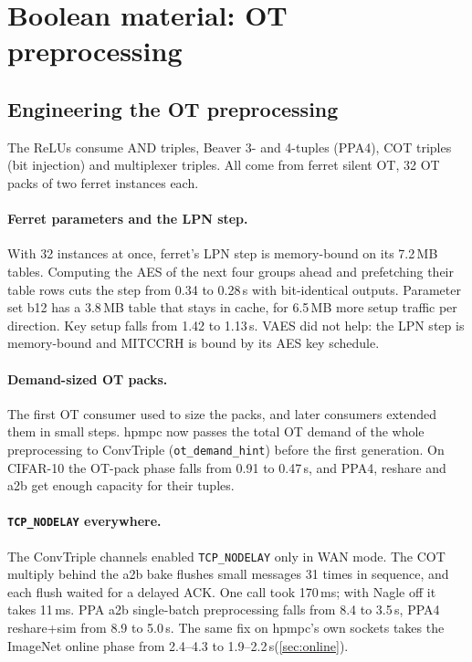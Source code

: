 \documentclass[10pt,a4paper]{article}
\newcommand{\flag}[1]{\nolinkurl{#1}}
\newcommand{\ms}{\,ms\xspace}
\newcommand{\s}{\,s\xspace}
\begin{document}
\section{Boolean material: OT preprocessing}\label{sec:ot}




\subsection{Engineering the OT preprocessing}

The ReLUs consume AND triples, Beaver 3- and 4-tuples (PPA4), COT triples (bit injection) and multiplexer
triples. All come from ferret silent OT, 32 OT packs of two ferret instances each.

\paragraph{Ferret parameters and the LPN step.} With 32 instances at once, ferret's LPN step is
memory-bound on its 7.2\,MB tables. Computing the AES of the next four groups ahead and prefetching their table rows
cuts the step from 0.34 to 0.28\s with bit-identical outputs. Parameter set b12 has a 3.8\,MB table that
stays in cache, for 6.5\,MB more setup traffic per direction. Key setup falls from 1.42 to 1.13\s. VAES did not help:
the LPN step is memory-bound and MITCCRH is bound by its AES key schedule.

\paragraph{Demand-sized OT packs.} The first OT consumer used to size the packs, and later consumers
extended them in small steps. hpmpc now passes the total OT demand of the whole preprocessing to ConvTriple
(\texttt{ot\_demand\_hint}) before the first generation. On CIFAR-10 the OT-pack phase falls from 0.91 to 0.47\s,
and PPA4, reshare and a2b get enough capacity for their tuples.

\paragraph{\flag{TCP_NODELAY} everywhere.} The ConvTriple channels enabled \flag{TCP_NODELAY} only in WAN
mode. The COT multiply behind the a2b bake flushes small messages 31 times in sequence, and each flush waited
for a delayed ACK. One call took 170\ms; with Nagle off it takes 11\ms. PPA a2b single-batch
preprocessing falls from 8.4 to 3.5\s, PPA4 reshare+sim from 8.9 to 5.0\s. The same fix on hpmpc's own
sockets takes the ImageNet online phase from 2.4--4.3 to 1.9--2.2\s (\cref{sec:online}).
\end{document}
